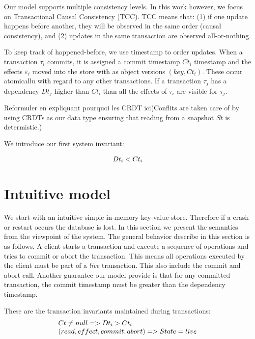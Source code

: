 \documentclass[systeme,french,english]{compas2022}
\begin{document}
Our model supports multiple consistency levels. In this work however, we focus on Transactional Causal Consistency (TCC).
TCC means that: (1) if one update happens before another, they will be observed in the same order (causal consistency), and (2) updates in the same transaction are observed all-or-nothing.

To keep track of happened-before, we use timestamp to order updates.
When a transaction $\tau_i$ commits, it is assigned a commit timestamp $Ct_i$ timestamp and the effects $\varepsilon_i$ moved into the store with as object versions $(key,Ct_i)$.
These occur atomicallu with regard to any other transactions.
If a transaction $\tau_j$ has a dependency $Dt_j$ higher than $Ct_i$ than all the effects of $\tau_i$ are visible for $\tau_j$.

Reformuler en expliquant pourquoi les CRDT ici(Conflits are taken care of by using CRDTs as our data type ensuring that reading from a snapshot $St$ is determistic.)

We introduce our first system invariant:

\[
  \begin{array}{lcl}
    \emph{$Dt_i < Ct_i$}
  \end{array} 
\]

\section{Intuitive model}

We start with an intuitive simple in-memory key-value store.
Therefore if a crash or restart occurs the database is lost.
In this section we present the semantics from the viewpoint of the system.
The general behavior describe in this section is as follows.
A client starts a transaction and execute a sequence of operations and tries to commit or abort the transaction.
This means all operations executed by the client must be part of a \emph{live} transaction.
This also include the commit and abort call.
Another guarantee our model provide is that for any committed transaction, the commit timestamp must be greater than the dependency timestamp.

These are the transaction invariants maintained during transactions:
\[
  \begin{array}{lcl}
    \emph{$Ct \neq null => Dt_i > Ct_i$}\\
    \emph{$(read, effect, commit, abort) => State = live$}
  \end{array} 
\]
\end{document}
